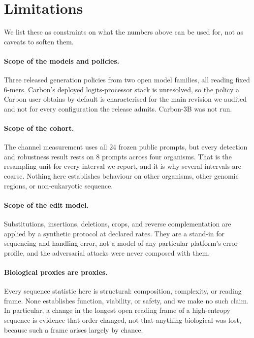 \section{Limitations}

We list these as constraints on what the numbers above can be used for, not as caveats to soften them.

\paragraph{Scope of the models and policies.} Three released generation policies from two open model
families, all reading fixed 6-mers. Carbon's deployed logits-processor stack is unresolved, so the
policy a Carbon user obtains by default is characterised for the main revision we audited and not for
every configuration the release admits. Carbon-3B was not run.

\paragraph{Scope of the cohort.} The channel measurement uses all $24$ frozen public prompts, but every
detection and robustness result rests on $8$ prompts across four organisms. That is the resampling unit
for every interval we report, and it is why several intervals are coarse. Nothing here establishes
behaviour on other organisms, other genomic regions, or non-eukaryotic sequence.

\paragraph{Scope of the edit model.} Substitutions, insertions, deletions, crops, and reverse
complementation are applied by a synthetic protocol at declared rates. They are a stand-in for
sequencing and handling error, not a model of any particular platform's error profile, and the
adversarial attacks were never composed with them.

\paragraph{Biological proxies are proxies.} Every sequence statistic here is structural: composition,
complexity, or reading frame. None establishes function, viability, or safety, and we make no such
claim. In particular, a change in the longest open reading frame of a high-entropy sequence is evidence
that order changed, not that anything biological was lost, because such a frame arises largely by
chance.

